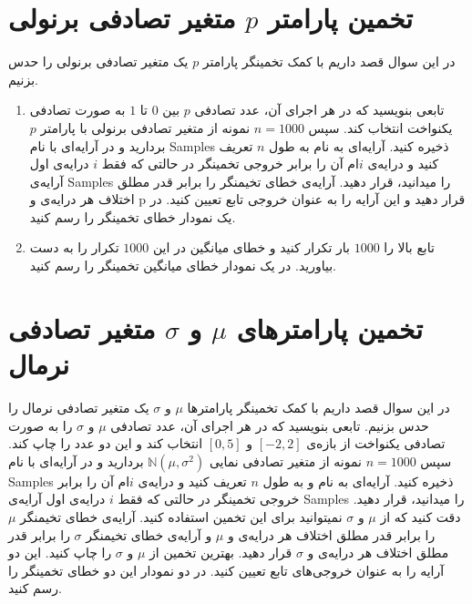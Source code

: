 \documentclass[a4paper]{article}
\begin{document}
\section{ 
تخمین پارامتر $ p $ متغیر تصادفی برنولی
}
در این سوال قصد داریم با کمک تخمینگر 
پارامتر $ p $ یک متغیر تصادفی برنولی را حدس بزنیم.
\begin{enumerate}
	\item 
تابعی بنویسید که در هر اجرای آن، عدد تصادفی $ p $ بین $ 0 $ تا $ 1 $ به صورت تصادفی یکنواخت انتخاب کند. سپس 
$ n = 1000 $ 
نمونه از متغیر تصادفی برنولی با پارامتر $ p  $ بردارید و در آرایه‌ای با نام Samples ذخیره کنید. آرایه‌ای به نام 
به طول $ n $ تعریف کنید و درایه‌ی $ i $ام آن را برابر خروجی تخمینگر  
در حالتی که فقط $ i $ درایه‌ی اول آرایه‌ی Samples را میدانید، قرار دهید. آرایه‌ی خطای تخیمنگر را برابر قدر مطلق اختلاف هر درایه‌ی 
و 
 p  
 قرار دهید و این آرایه را به عنوان خروجی تابع تعیین کنید. در یک نمودار خطای تخمینگر را رسم کنید.
	 \item 
تابع بالا را $ 1000 $ بار تکرار کنید و خطای میانگین در این $ 1000 $ تکرار را به دست بیاورید. در یک نمودار خطای میانگین تخمینگر را رسم کنید.
\end{enumerate}

\section{ 
تخمین پارامترهای  $ \mu $ و $ \sigma $ متغیر تصادفی نرمال
}
در این سوال قصد داریم با کمک تخمینگر 
پارامترها  $ \mu $ و $ \sigma $
یک متغیر تصادفی نرمال را حدس بزنیم. تابعی بنویسید که در هر اجرای آن، عدد تصادفی 
$ \mu $ 
و 
$ \sigma $
را به صورت تصادفی یکنواخت از بازه‌ی 
$ [-2,2] $
و
$ [0,5] $
 انتخاب کند و این دو عدد را چاپ کند. سپس 
 $ n = 1000 $ 
 نمونه از متغیر تصادفی نمایی
 $ \mathbb{N}(\mu,\sigma^{2}) $
 بردارید و در آرایه‌ای با نام Samples ذخیره کنید.
  آرایه‌ای به نام 
 و
 به طول $ n $ تعریف کنید و درایه‌ی $ i $ام آن را برابر خروجی تخمینگر  
 در حالتی که فقط $ i $ درایه‌ی اول آرایه‌ی Samples را میدانید، قرار دهید. دقت کنید که از 
 $ \mu $ 
 و 
 $ \sigma $
 نمیتوانید برای این تخمین استفاده کنید. 
 آرایه‌ی خطای تخیمنگر $ \mu $ را برابر قدر مطلق اختلاف هر درایه‌ی 
 و 
$ \mu $
 و آرایه‌ی خطای تخیمنگر $ \sigma $ را برابر قدر مطلق اختلاف هر درایه‌ی 
 و 
$ \sigma $
 قرار دهید.
 بهترین تخمین از 
  $ \mu $ 
 و 
 $ \sigma $
 را چاپ کنید. 
این دو آرایه را به عنوان خروجی‌های تابع تعیین کنید. در دو نمودار این دو خطای تخمینگر را رسم کنید.
\newpage
\end{document}
